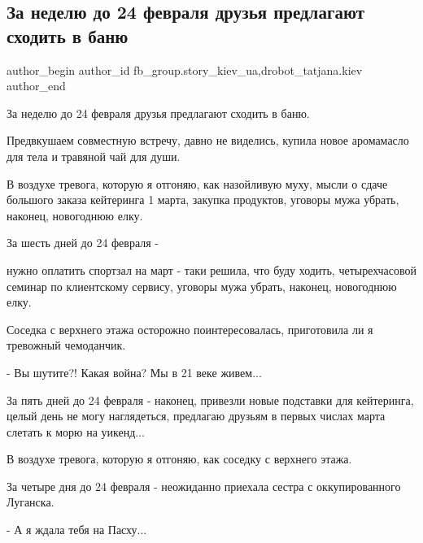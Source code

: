  
 
 
 
 

\subsection{За неделю до 24 февраля друзья   предлагают сходить в баню}
\label{sec:21_02_2023.fb.fb_group.story_kiev_ua.1.za_nedelyu_do_24_fev}
 
\ifcmt
 author_begin
   author_id fb_group.story_kiev_ua,drobot_tatjana.kiev
 author_end
\fi

За неделю до 24 февраля друзья предлагают сходить в баню. 

Предвкушаем совместную встречу, давно не виделись, купила новое аромамасло для
тела и травяной чай для души. 

В воздухе тревога, которую я отгоняю, как назойливую муху, мысли о сдаче
большого заказа кейтеринга 1 марта, закупка продуктов, уговоры мужа убрать,
наконец, новогоднюю елку. 

За шесть дней до 24 февраля - 

нужно оплатить спортзал на март - таки решила, что буду ходить, четырехчасовой
семинар по клиентскому сервису, уговоры мужа убрать, наконец, новогоднюю елку. 

Соседка с верхнего этажа осторожно поинтересовалась, приготовила ли я тревожный
чемоданчик. 

- Вы шутите?! Какая война? Мы в 21 веке живем...

За пять дней до 24 февраля - наконец, привезли новые подставки для кейтеринга,
целый день не могу наглядеться, предлагаю друзьям в первых числах марта слетать
к морю на уикенд...

В воздухе тревога, которую я отгоняю, как соседку с верхнего этажа. 

За четыре дня до 24 февраля - неожиданно приехала сестра с оккупированного
Луганска. 

- А я ждала тебя на Пасху...

